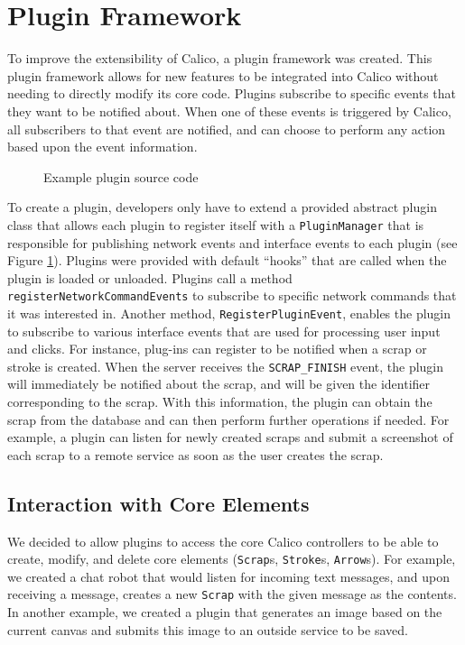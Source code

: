 \section{Plugin Framework}
To improve the extensibility of Calico, a plugin framework was created. This plugin framework allows for new features to be integrated into Calico without needing to directly modify its core code. Plugins subscribe to specific events that they want to be notified about. When one of these events is triggered by Calico, all subscribers to that event are notified, and can choose to perform any action based upon the event information. 

\begin{figure}[h!]
  \centering
  \small
  
  \normalsize
  \caption{Example plugin source code}
  \label{code:plugin_file}
\end{figure}

To create a plugin, developers only have to extend a provided abstract plugin class that allows each plugin to register itself with a \texttt{PluginManager} that is responsible for publishing network events and interface events to each plugin (see Figure \ref{code:plugin_file}). Plugins were provided with default ``hooks'' that are called when the plugin is loaded or unloaded. Plugins call a method \texttt{registerNetworkCommandEvents} to subscribe to specific network commands that it was interested in. Another method, \texttt{RegisterPluginEvent}, enables the plugin to subscribe to various interface events that are used for processing user input and clicks. For instance, plug-ins can register to be notified when a scrap or stroke is created. When the server receives the \texttt{SCRAP\_FINISH} event, the plugin will immediately be notified about the scrap, and will be given the identifier corresponding to the scrap. With this information, the plugin can obtain the scrap from the database and can then perform further operations if needed. For example, a plugin can listen for newly created scraps and submit a screenshot of each scrap to a remote service as soon as the user creates the scrap.

\subsection*{Interaction with Core Elements}
We decided to allow plugins to access the core Calico controllers to be able to create, modify, and delete core elements (\texttt{Scrap}s, \texttt{Stroke}s, \texttt{Arrow}s). For example, we created a chat robot that would listen for incoming text messages, and upon receiving a message, creates a new \texttt{Scrap} with the given message as the contents. In another example, we created a plugin that generates an image based on the current canvas and submits this image to an outside service to be saved.

